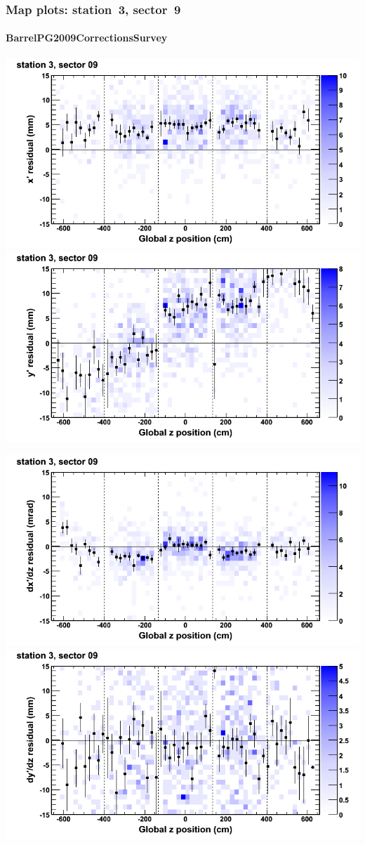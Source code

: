 \documentclass[compress]{beamer}
\begin{document}
\begin{frame}
\frametitle{Map plots: station~3, sector~9}
\framesubtitle{BarrelPG2009CorrectionsSurvey}
\includegraphics[width=0.5\linewidth]{mapplots_01/DTvsz_st3sec09_x.png}
\includegraphics[width=0.5\linewidth]{mapplots_01/DTvsz_st3sec09_y.png}

\includegraphics[width=0.5\linewidth]{mapplots_01/DTvsz_st3sec09_dxdz.png}
\includegraphics[width=0.5\linewidth]{mapplots_01/DTvsz_st3sec09_dydz.png}
\end{frame}
\end{document}
